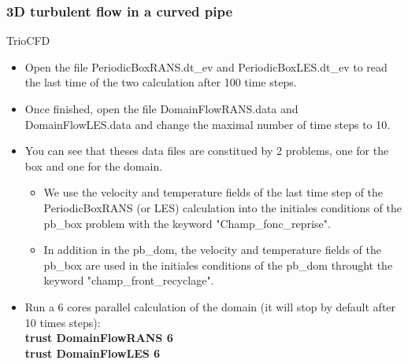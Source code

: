 \documentclass[10pt]{beamer}
\begin{document}
\begin{frame}
\frametitle{3D turbulent flow in a curved pipe}
\begin{block}{TrioCFD}

\begin{itemize}
\item Open the file PeriodicBoxRANS.dt\_ev and PeriodicBoxLES.dt\_ev to read the last time of the two calculation after 100 time steps.

\item Once finished, open the file DomainFlowRANS.data and DomainFlowLES.data and change the maximal number of time steps to 10.

\item You can see that theses data files are constitued by 2 problems, one for the box and one for the domain.
    \begin {itemize}
    \item We use the velocity and temperature fields of the last time step of the PeriodicBoxRANS (or LES) calculation into the initiales conditions of the pb\_box problem with the keyword "Champ\_fonc\_reprise".
    \item In addition in the pb\_dom, the velocity and temperature fields of the pb\_box are used in the initiales conditions of the pb\_dom throught the keyword "champ\_front\_recyclage".
    \end{itemize}

\item Run a 6 cores parallel calculation of the domain (it will stop by default after 10 times steps):\\
\textbf{trust DomainFlowRANS 6}\\
\textbf{trust DomainFlowLES 6}

\end{itemize}

\end{block}
\end{frame}
\end{document}
